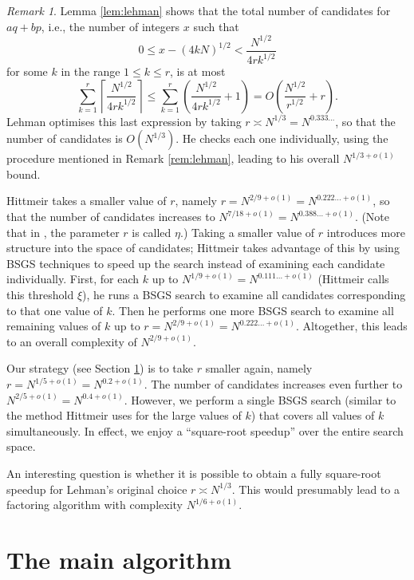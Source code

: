 \documentclass[reqno]{amsart}
\theoremstyle{remark}
\newtheorem{rem}[thm]{Remark}
\numberwithin{equation}{section}
\numberwithin{thm}{section}
\renewcommand{\leq}{\leqslant}
\begin{document}
\begin{rem}
\label{rem:discussion}
  Lemma \ref{lem:lehman} shows that the total number of
  candidates for $aq + bp$,
  i.e., the number of integers $x$ such that
    \[ 0 \leq x - (4kN)^{1/2} < \frac{N^{1/2}}{4rk^{1/2}} \]
  for some $k$ in the range $1 \leq k \leq r$, is at most
    \[ \sum_{k=1}^r \left\lceil \frac{N^{1/2}}{4rk^{1/2}} \right\rceil
       \leq \sum_{k=1}^r \left(\frac{N^{1/2}}{4rk^{1/2}} + 1\right)
      = O\left( \frac{N^{1/2}}{r^{1/2}} + r \right). \]
  Lehman optimises this last expression by taking
  $r \asymp N^{1/3} = N^{0.333\ldots}$,
  so that the number of candidates is $O(N^{1/3})$.
  He checks each one individually,
  using the procedure mentioned in Remark \ref{rem:lehman},
  leading to his overall $N^{1/3+o(1)}$ bound.

  Hittmeir \cite{Hit-timespace} takes a smaller value of $r$,
  namely $r = N^{2/9+o(1)} = N^{0.222\ldots+o(1)}$,
  so that the number of candidates increases to
  $N^{7/18+o(1)} = N^{0.388\ldots+o(1)}$.
  (Note that in \cite{Hit-timespace}, the parameter $r$ is called $\eta$.)
  Taking a smaller value of $r$ introduces more structure
  into the space of candidates;
  Hittmeir takes advantage of this by using BSGS techniques
  to speed up the search instead of examining each candidate individually.
  First, for each $k$ up to $N^{1/9+o(1)} = N^{0.111\ldots+o(1)}$
  (Hittmeir calls this threshold $\xi$),
  he runs a BSGS search to examine all candidates corresponding
  to that one value of $k$.
  Then he performs one more BSGS search to examine all
  remaining values of $k$ up to
  $r = N^{2/9+o(1)} = N^{0.222\ldots+o(1)}$.
  Altogether, this leads to an overall complexity of $N^{2/9+o(1)}$.

  Our strategy (see Section \ref{sec:main})
  is to take $r$ smaller again,
  namely $r = N^{1/5+o(1)} = N^{0.2+o(1)}$.
  The number of candidates increases even further to
  $N^{2/5+o(1)} = N^{0.4+o(1)}$.
  However, we perform a single BSGS search
  (similar to the method Hittmeir uses for the large values of $k$)
  that covers all values of $k$ simultaneously.
  In effect, we enjoy a ``square-root speedup'' over the entire search space.

  An interesting question is whether it is possible to obtain a fully
  square-root speedup for Lehman's original choice $r \asymp N^{1/3}$.
  This would presumably lead to a factoring algorithm with complexity
  $N^{1/6+o(1)}$.
\end{rem}


\section{The main algorithm}
\label{sec:main}
\end{document}
